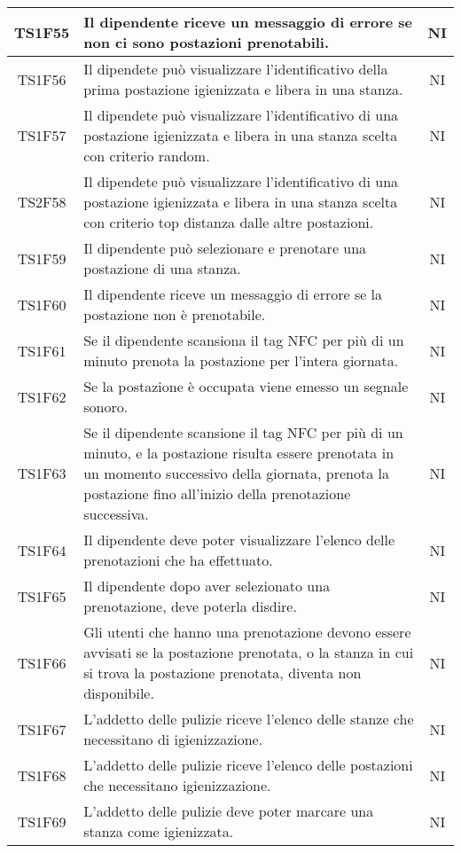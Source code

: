 \begin{center}
\begin{longtable}{|c|p{10cm}|c|}
			\hline
			TS1F55 & Il dipendente riceve un messaggio di errore se non ci sono postazioni prenotabili. & NI \\	
			\hline
			TS1F56 & Il dipendete può visualizzare l'identificativo della prima postazione igienizzata e libera in una stanza. & NI \\	
			\hline
			TS1F57 & Il dipendete può visualizzare l'identificativo di una postazione igienizzata e libera in una stanza scelta con criterio random. & NI \\	
			\hline
			TS2F58 & Il dipendete può visualizzare l'identificativo di una postazione igienizzata e libera in una stanza scelta con criterio top distanza dalle altre postazioni. & NI \\	
			\hline
			TS1F59 & Il dipendente può selezionare e prenotare una postazione di una stanza. & NI \\		
			\hline
			TS1F60 & Il dipendente riceve un messaggio di errore se la postazione non è prenotabile. & NI \\	
			\hline
			TS1F61 & Se il dipendente scansiona il tag NFC per più di un minuto prenota la postazione per l'intera giornata. & NI \\	
			\hline
			TS1F62 & Se la postazione è occupata viene emesso un segnale sonoro. & NI \\	
			\hline
			TS1F63 & Se il dipendente scansione il tag NFC per più di un minuto, e la postazione risulta essere prenotata in un momento successivo della giornata, prenota la postazione fino all'inizio della prenotazione successiva. & NI \\	
			\hline
			TS1F64 & Il dipendente deve poter visualizzare l'elenco delle prenotazioni che ha effettuato. & NI \\
			\hline
			TS1F65 & Il dipendente dopo aver selezionato una prenotazione, deve poterla disdire. & NI \\	
			\hline
			TS1F66 & Gli utenti che hanno una prenotazione devono essere avvisati se la postazione prenotata, o la stanza in cui si trova la postazione prenotata, diventa non disponibile. & NI \\	
			\hline
			TS1F67 & L'addetto delle pulizie riceve l'elenco delle stanze che necessitano di igienizzazione. & NI \\	
			\hline
			TS1F68 & L'addetto delle pulizie riceve l'elenco delle postazioni che necessitano igienizzazione. & NI \\	
			\hline
			TS1F69 & L'addetto delle pulizie deve poter marcare una stanza come igienizzata. & NI \\	

\end{longtable}
\end{center}
